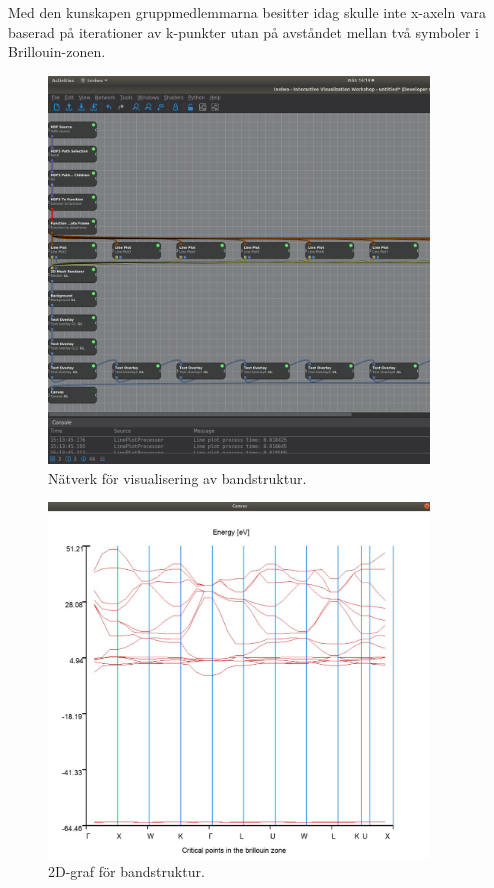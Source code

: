 \documentclass[10pt,oneside,swedish]{article}
\begin{document}
Med den kunskapen gruppmedlemmarna besitter idag skulle inte x-axeln
vara baserad på iterationer av k-punkter utan på avståndet mellan två
symboler i Brillouin-zonen.

\begin{figure}[H]
\centering
\includegraphics[width=0.9000\textwidth]{Images/network_bandstructure.png}
\caption{Nätverk för visualisering av bandstruktur.}
\end{figure}

\begin{figure}[H]
\centering
\includegraphics[width=0.90000\textwidth]{Images/new_bandstructure.jpg}
\caption{2D-graf för bandstruktur.}
\end{figure}
\end{document}

